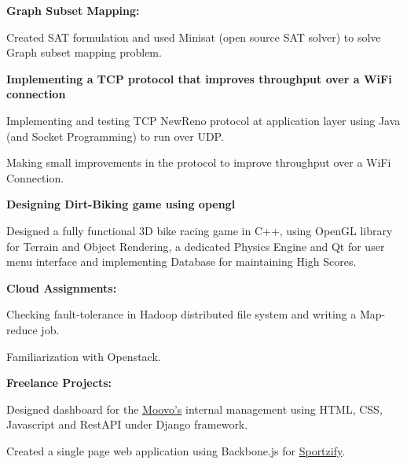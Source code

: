 \documentclass[10pt]{article} %
\begin{document}
\begin{itemize}
	{\item  \bf Graph Subset Mapping:\\}
	Created SAT formulation and used Minisat (open source SAT solver) to solve Graph subset mapping problem.


	{\item  \bf Implementing a TCP protocol that improves throughput over a WiFi connection}
	\begin{compactitem}
	\item  Implementing and testing TCP NewReno protocol at application layer using Java (and Socket Programming) to run over UDP.
	\item  Making small improvements in the protocol to improve throughput over a WiFi Connection.
	\end{compactitem}	
	{\item  \bf Designing Dirt-Biking game using opengl\\}Designed a fully functional 3D bike racing game in C++, using OpenGL 		library for Terrain and Object Rendering, a dedicated Physics Engine and Qt for user menu interface and implementing Database for maintaining High Scores.

	{\item  \bf Cloud Assignments:}
	\begin{compactitem}
	\item  Checking fault-tolerance in Hadoop distributed file system and writing a Map-reduce job.
	\item  Familiarization with Openstack.
	\end{compactitem}	

	{\item  \bf Freelance Projects:}
	\begin{compactitem}
	\item Designed dashboard for the \href {http://www.moovo.in/}{Moovo's} internal management using HTML, CSS, Javascript and RestAPI  under Django framework.
	\item Created a single page web application using Backbone.js for \href {http://www.sportzify.com/} {Sportzify}. 
	\end{compactitem}

	

	
\end{itemize}


\end{document}
